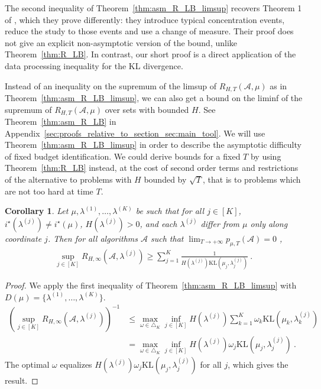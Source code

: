 \documentclass{article}
\newcommand{\KL}{\mathrm{KL}}
\newtheorem{corollary}{Corollary}
\begin{document}
The second inequality of Theorem~\ref{thm:asm_R_LB_limsup} recovers Theorem 1 of \cite{komiyama2022minimax}, which they prove differently: they introduce typical concentration events, reduce the study to those events and use a change of measure.
Their proof does not give an explicit non-asymptotic version of the bound, unlike Theorem~\ref{thm:R_LB}. %
In contrast, our short proof is a direct application of the data processing inequality for the KL divergence.

Instead of an inequality on the supremum of the limsup of $R_{H, T}(\mathcal A, \mu)$ as in Theorem~\ref{thm:asm_R_LB_limsup}, we can also get a bound on the liminf of the supremum of $R_{H, T}(\mathcal A, \mu)$ over sets with bounded $H$. See Theorem~\ref{thm:asm_R_LB} in Appendix~\ref{sec:proofs_relative_to_section_sec:main_tool}.
We will use Theorem~\ref{thm:asm_R_LB_limsup} in order to describe the asymptotic difficulty of fixed budget identification. We could derive bounds for a fixed $T$ by using Theorem~\ref{thm:R_LB} instead, at the cost of second order terms and restrictions of the alternative to problems with $H$ bounded by $\sqrt{T}$, that is to problems which are not too hard at time $T$. 
\begin{corollary}\label{cor:corner_lb}
Let $\mu, \lambda^{(1)}, \ldots, \lambda^{(K)}$ be such that for all $j \in [K]$, $i^\star(\lambda^{(j)}) \ne i^\star(\mu)$, $H(\lambda^{(j)})>0$, and each $\lambda^{(j)}$ differ from $\mu$ only along coordinate $j$. Then for all algorithms $\mathcal A$ such that $\lim_{T \to +\infty} p_{\mu, T}(\mathcal A) = 0$ ,
\begin{align*}
\sup_{j \in [K]} R_{H,\infty}(\mathcal A,\lambda^{(j)})
\ge \sum_{j=1}^K \frac{1}{H(\lambda^{(j)}) \KL(\mu_j, \lambda_j^{(j)})}
\: .
\end{align*}
\end{corollary}

\begin{proof}
We apply the first inequality of Theorem~\ref{thm:asm_R_LB_limsup} with $D(\mu) = \{\lambda^{(1)}, \ldots, \lambda^{(K)}\}$.
\begin{align*}
(\sup_{j \in [K]} R_{H,\infty}(\mathcal A, \lambda^{(j)}))^{-1}
&\le \max_{\omega \in \triangle_K} \inf_{j \in [K]} H(\lambda^{(j)})\sum_{k=1}^K \omega_k \KL(\mu_k, \lambda_k^{(j)})
\\
&= \max_{\omega \in \triangle_K} \inf_{j \in [K]} H(\lambda^{(j)}) \omega_j \KL(\mu_j, \lambda_j^{(j)})
\: .
\end{align*}
The optimal $\omega$ equalizes $H(\lambda^{(j)}) \omega_j \KL(\mu_j, \lambda_j^{(j)})$ for all $j$, which gives the result.
\end{proof}
\end{document}
